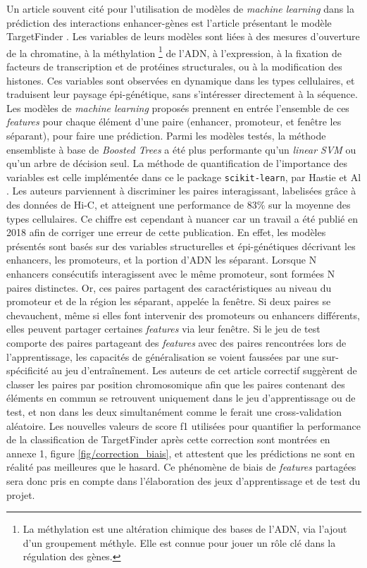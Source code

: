 \documentclass[french]{llncs}
\begin{document}
Un article souvent cité pour l'utilisation de modèles de \textit{machine learning} dans la prédiction des interactions enhancer-gènes est l'article présentant le modèle TargetFinder \cite{whalen_enhancerpromoter_2016}. Les variables de leurs modèles sont liées à des mesures d'ouverture de la chromatine, à la méthylation \footnote{La méthylation est une altération chimique des bases de l'ADN, via l'ajout d'un groupement méthyle. Elle est connue pour jouer un rôle clé dans la régulation des gènes.} de l'ADN, à l'expression, à la fixation de facteurs de transcription et de protéines structurales, ou à la modification des histones. Ces variables sont observées en dynamique dans les types cellulaires, et traduisent leur paysage épi-génétique, sans s'intéresser directement à la séquence. Les modèles de \textit{machine learning} proposés prennent en entrée l'ensemble de ces \textit{features} pour chaque élément d'une paire (enhancer, promoteur, et fenêtre les séparant), pour faire une prédiction.
Parmi les modèles testés, la méthode ensembliste à base de \textit{Boosted Trees} a été plus performante qu'un \textit{linear SVM} ou qu'un arbre de décision seul. La méthode de quantification de l'importance des variables est celle implémentée dans ce le package \texttt{scikit-learn}, par Hastie et Al \cite{hastie2005elements}. Les auteurs parviennent à discriminer les paires interagissant, labelisées grâce à des données de Hi-C, et atteignent une performance de 83\% sur la moyenne des types cellulaires. Ce chiffre est cependant à nuancer car un travail \cite{xi_local_2018} a été publié en 2018 afin de corriger une erreur de cette publication. En effet, les modèles présentés sont basés sur des variables structurelles et épi-génétiques décrivant les enhancers, les promoteurs, et la portion d'ADN les séparant. Lorsque N enhancers consécutifs interagissent avec le même promoteur, sont formées N paires distinctes. Or, ces paires partagent des caractéristiques au niveau du promoteur et de la région les séparant, appelée la fenêtre. 
Si deux paires se chevauchent, même si elles font intervenir des promoteurs ou enhancers différents, elles peuvent partager certaines \textit{features} via leur fenêtre. Si le jeu de test comporte des paires partageant des \textit{features} avec des paires rencontrées lors de l'apprentissage, les capacités de généralisation se voient faussées par une sur-spécificité au jeu d'entraînement. Les auteurs de cet article correctif suggèrent de classer les paires par position chromosomique afin que les paires contenant des éléments en commun se retrouvent uniquement dans le jeu d'apprentissage ou de test, et non dans les deux simultanément comme le ferait une cross-validation aléatoire. Les nouvelles valeurs de score f1 utilisées pour quantifier la performance de la classification de TargetFinder après cette correction sont montrées en annexe 1, figure \ref{fig/correction_biais}, et attestent que les prédictions ne sont en réalité pas meilleures que le hasard.
 Ce phénomène de biais de \textit{features} partagées sera donc pris en compte dans l'élaboration des jeux d'apprentissage et de test du projet.
\end{document}
